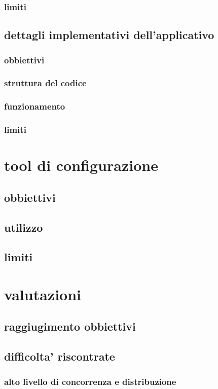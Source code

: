 \documentclass[a4paper]{article}
\begin{document}
\subsubsection{limiti}
\subsection{dettagli implementativi dell'applicativo}
\subsubsection{obbiettivi}
\subsubsection{struttura del codice}
\subsubsection{funzionamento}
\subsubsection{limiti}

\section{tool di configurazione}
\subsection{obbiettivi}
\subsection{utilizzo}
\subsection{limiti}

\section{valutazioni}
\subsection{raggiugimento obbiettivi}
\subsection{difficolta' riscontrate}
\subsubsection{alto livello di concorrenza e distribuzione}
\end{document}

